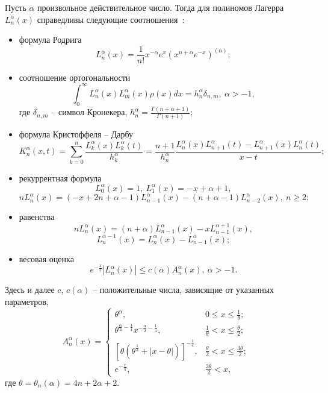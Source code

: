 Пусть $\alpha$ произвольное действительное число. Тогда для полиномов Лагерра $L_n^\alpha(x)$ справедливы следующие соотношения~\cite{Gadzhimirzaev:Szego}:
\begin{itemize}
\item
формула Родрига
$$
L_n^\alpha(x)=\frac{1}{n!}x^{-\alpha}e^x\left(x^{n+\alpha}e^{-x}\right)^{(n)};
$$

\item
соотношение ортогональности
$$
\int_{0}^{\infty}L_n^\alpha(x)L_m^\alpha(x)\rho(x)dx=h_n^\alpha\delta_{n,m},\ \alpha>-1,
$$
где $\delta_{n,m}$ -- символ Кронекера, $h_n^\alpha=\frac{\Gamma(n+\alpha+1)}{\Gamma(n+1)}$;
\item
формула Кристоффеля -- Дарбу
\begin{equation*}\label{Gadzhimirzaev:Darbu}	
K_n^\alpha(x,t)=\sum_{k=0}^{n}\frac{L_k^\alpha(x)L_k^\alpha(t)}{h_k^\alpha}=
\frac{n+1}{h_n^\alpha}\frac{L_n^\alpha(x)L_{n+1}^\alpha(t)-L_{n+1}^\alpha(x)L_n^\alpha(t)}{x-t};
\end{equation*}

\item
рекуррентная формула
$$
L_0^\alpha(x)=1, \ L_1^\alpha(x)=-x+\alpha+1,
$$
\begin{equation*}\label{Gadzhimirzaev:recur}
nL_n^\alpha(x)=(-x+2n+\alpha-1)L_{n-1}^\alpha(x)-(n+\alpha-1)L_{n-2}^{\alpha}(x), \ n\ge2;
\end{equation*}

\item
равенства
\begin{equation*}\label{Gadzhimirzaev:prop1}
nL_n^\alpha(x)=(n+\alpha)L_{n-1}^\alpha(x)-xL_{n-1}^{\alpha+1}(x),
\end{equation*}
\begin{equation*}\label{Gadzhimirzaev:prop2}
L_n^{\alpha-1}(x)=L_{n}^\alpha(x)-L_{n-1}^{\alpha}(x);
\end{equation*}

\item
весовая оценка~\cite{Gadzhimirzaev:AskeyWain,Gadzhimirzaev:Mocken}
\begin{equation*}\label{Gadzhimirzaev:weight-est}
e^{-\frac{x}{2}}|L_n^\alpha(x)|\le c(\alpha)A_n^\alpha(x),\ \alpha>-1.
\end{equation*}
\end{itemize}
Здесь и далее $c$, $c(\alpha)$ -- положительные числа, зависящие от указанных параметров,
$$
A_n^\alpha(x)=
\begin{cases}
	\theta^\alpha, & 0\le x\le \frac{1}{\theta}; \\
	\theta^{\frac{\alpha}{2}-\frac14}x^{-\frac{\alpha}{2}-\frac14}, & \frac{1}{\theta}< x\le \frac{\theta}{2}; \\
	\left[\theta\left(\theta^{\frac13}+|x-\theta|\right)\right]^{-\frac14}, & \frac{\theta}{2}< x\le \frac{3\theta}{2}; \\
	e^{-\frac x4}, & \frac{3\theta}{2}<x,
\end{cases}
$$
где $\theta=\theta_n(\alpha)=4n+2\alpha+2$.

